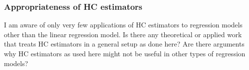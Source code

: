 \documentclass{Z}
\begin{document}
\subsubsection*{Appropriateness of HC estimators}

I am aware of only very few applications of HC estimators to regression 
models other than the linear regression model. Is there any theoretical
or applied work that treats HC estimators in a general setup as done
here? Are there arguments why HC estimators as used here might not 
be useful in other types of regression models?
\end{document}
